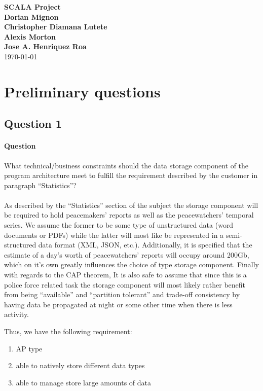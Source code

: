 \documentclass[11pt]{article}
\begin{document}
\begin{titlepage}
  \begin{center}
    \vspace*{1cm} \Huge \textbf{SCALA Project}\\
    \vspace*{2\baselineskip} \large
    \vfill \normalsize \textbf{Dorian Mignon}\\ \textbf{Christopher Diamana
      Lutete}\\ \textbf{Alexis Morton}\\ \textbf{Jose A. Henriquez Roa}\\
    \vspace*{2\baselineskip} \today \rhead{\today}
    \newpage
    \normalsize \tableofcontents
    \newpage
  \end{center}
\end{titlepage}

\section{Preliminary questions}
\subsection{Question 1}
\paragraph{Question} What technical/business constraints should the data storage
component of the program architecture meet to fulfill the requirement described
by the customer in paragraph ``Statistics''?\\\\ As described by the ``Statistics''
section of the subject the storage component will be required to hold
peacemakers' reports as well as the peacewatchers' temporal series. We assume
the former to be some type of unstructured data (word documents or PDFs) while
the latter will most like be represented in a semi-structured data format (XML,
JSON, etc.). Additionally, it is specified that the estimate of a day's worth of
peacewatchers' reports will occupy around 200Gb, which on it's own greatly
influences the choice of type storage component. Finally with regards to the CAP
theorem, It is also safe to assume that since this is a police force related
task the storage component will most likely rather benefit from being
``available'' and ``partition tolerant'' and trade-off consistency by having data be
propagated at night or some other time when there is less activity.\par Thus, we
have the following requirement:
\begin{enumerate}
\item AP type
\item able to natively store different data types
\item able to manage store large amounts of data
\end{enumerate}
\end{document}
